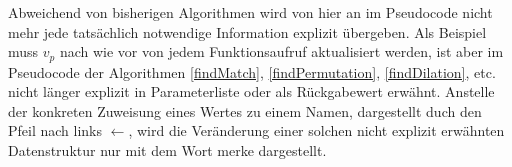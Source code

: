 \begin{algorithm}
\DontPrintSemicolon
\caption{$\mathrm{findMatch} \colon M \times T \rightarrow \mathit{Bool}$}\label{findMatch}

 {
}
\end{algorithm}

\begin{algorithm}
\DontPrintSemicolon
\caption{$\mathrm{rematch} \colon M \times T \rightarrow \mathit{Bool}$}\label{rematch}
 {
	 {
	}
	 {
	}
	 {
	}
}        
\end{algorithm}

Abweichend von bisherigen Algorithmen wird von hier an im Pseudocode nicht mehr jede tatsächlich notwendige Information explizit übergeben. Als Beispiel muss $v_p$ nach wie vor von jedem Funktionsaufruf aktualisiert werden, ist aber im Pseudocode der Algorithmen \ref{findMatch}, \ref{findPermutation}, \ref{findDilation}, etc. nicht länger explizit in Parameterliste oder als Rückgabewert erwähnt.
Anstelle der konkreten Zuweisung eines Wertes zu einem Namen, dargestellt duch den Pfeil nach links \glqq $\leftarrow$\grqq{}, wird die Veränderung einer solchen nicht explizit erwähnten Datenstruktur nur mit dem Wort \glqq merke\grqq{} dargestellt.

